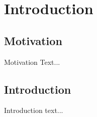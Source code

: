 \chapter{Introduction}

\section{Motivation}

Motivation Text...

\section{Introduction}


Introduction text...